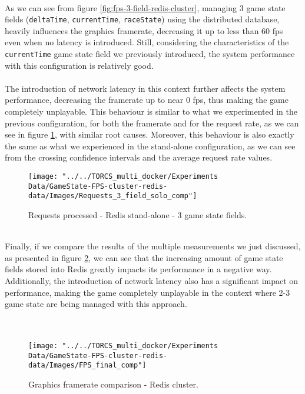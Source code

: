 \\ As we can see from figure \ref{fig:fps-3-field-redis-cluster}, managing 3 game state fields (\texttt{deltaTime}, \texttt{currentTime}, \texttt{raceState}) using the distributed database, heavily influences the graphics framerate, decreasing it up to less than 60 fps even when no latency is introduced. Still, considering the characteristics of the \texttt{currentTime} game state field we previously introduced, the system performance with this configuration is relatively good. \\ \\
The introduction of network latency in this context further affects the system performance, decreasing the framerate up to near 0 fps, thus making the game completely unplayable. This behaviour is similar to what we experimented in the previous configuration, for both the framerate and for the request rate, as we can see in figure \ref{fig:requests-3-field-redis-cluster}, with similar root causes. Moreover, this behaviour is also exactly the same as what we experienced in the stand-alone configuration, as we can see from the crossing confidence intervals and the average request rate values. \\
\begin{figure}[h!]
	\centering
	\texttt{[image: "../../TORCS\_multi\_docker/Experiments Data/GameState-FPS-cluster-redis-data/Images/Requests\_3\_field\_solo\_comp"]}
	\caption[Requests processed - Redis cluster - 3 game state fields]{Requests processed - Redis stand-alone - 3 game state fields.}
	\label{fig:requests-3-field-redis-cluster}
\end{figure}
\pagebreak
\\ Finally, if we compare the results of the multiple measurements we just discussed, as presented in figure \ref{fig:fps-comparison-redis-cluster}, we can see that the increasing amount of game state fields stored into Redis greatly impacts its performance in a negative way. \\
Additionally, the introduction of network latency also has a significant impact on performance, making the game completely unplayable in the context where 2-3 game state are being managed with this approach. \\ \\ \\
\begin{figure}[h!]
	\centering
	\texttt{[image: "../../TORCS\_multi\_docker/Experiments Data/GameState-FPS-cluster-redis-data/Images/FPS\_final\_comp"]}
	\caption[Graphics framerate comparison - Redis cluster]{Graphics framerate comparison - Redis cluster.}
	\label{fig:fps-comparison-redis-cluster}
\end{figure}
